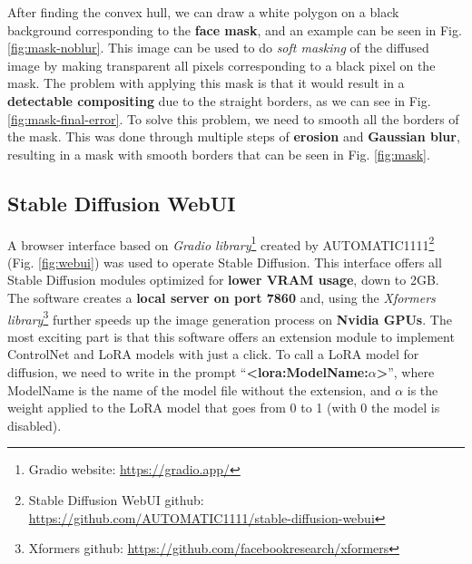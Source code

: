 \documentclass[preprint]{elsarticle}
\begin{document}
After finding the convex hull, we can draw a white polygon on a black background corresponding to the \textbf{face mask}, 
and an example can be seen in Fig. \ref{fig:mask-noblur}. 
This image can be used to do \emph{soft masking} of the diffused image by making transparent all 
pixels corresponding to a black pixel on the mask. 
The problem with applying this mask is that it would result in a \textbf{detectable compositing} due to the straight borders, 
as we can see in Fig. \ref{fig:mask-final-error}. 
To solve this problem, we need to smooth all the borders of the mask. 
This was done through multiple steps of \textbf{erosion} and \textbf{Gaussian blur}, 
resulting in a mask with smooth borders that can be seen in Fig. \ref{fig:mask}.

\subsection{Stable Diffusion WebUI} \label{sec:stable_diffusion_webui}


A browser interface based on \emph{Gradio library}\footnote{Gradio website: \url{https://gradio.app/}} 
created by AUTOMATIC1111\footnote{Stable Diffusion WebUI github: \url{https://github.com/AUTOMATIC1111/stable-diffusion-webui}} 
(Fig. \ref{fig:webui}) 
was used to operate Stable Diffusion. 
This interface offers all Stable Diffusion modules optimized for \textbf{lower VRAM usage}, down to 2GB. 
The software creates a \textbf{local server on port 7860} and, 
using the \emph{Xformers library}\footnote{Xformers github: \url{https://github.com/facebookresearch/xformers}} 
further speeds up the image generation process on \textbf{Nvidia GPUs}.
The most exciting part is that this software offers an extension module to 
implement ControlNet and LoRA models with just a click. 
To call a LoRA model for diffusion, we need to write in the prompt ``\textbf{<lora:ModelName:$\alpha$>}'', 
where ModelName is the name of the model file without the extension, 
and $\alpha$ is the weight applied to the LoRA model that goes from 0 to 1 (with 0 the model is disabled). 
\end{document}
